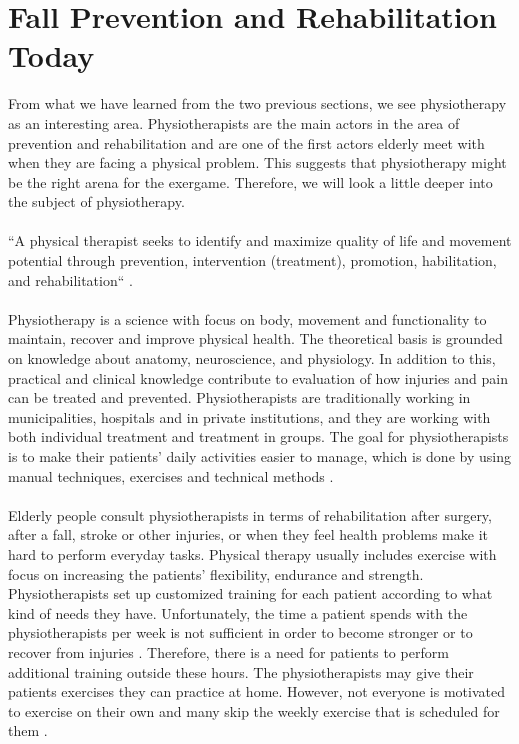 \section{Fall Prevention and Rehabilitation Today}
From what we have learned from the two previous sections, we see physiotherapy as an interesting area. Physiotherapists are the main actors in the area of prevention and rehabilitation and are one of the first actors elderly meet with when they are facing a physical problem. This suggests that physiotherapy might be the right arena for the exergame. Therefore, we will look a little deeper into the subject of physiotherapy. \\ \\“A physical therapist seeks to identify and maximize quality of life and movement potential through prevention, intervention (treatment), promotion, habilitation, and rehabilitation“ \cite{physiocite}.\\ \\
Physiotherapy is a science with focus on body, movement and functionality to maintain, recover and improve physical health. The theoretical basis is grounded on knowledge about anatomy, neuroscience, and physiology. In addition to this, practical and clinical knowledge contribute to evaluation of how injuries and pain can be treated and prevented. Physiotherapists are traditionally working in municipalities, hospitals and in private institutions, and they are working with both individual treatment and treatment in groups. The goal for physiotherapists is to make their patients' daily activities easier to manage, which is done by using manual techniques, exercises and technical methods \cite{physiotherapy1}\cite{physiotherapy2}.  \\ \\
Elderly people consult physiotherapists in terms of rehabilitation after surgery, after a fall, stroke or other injuries, or when they feel health problems make it hard to perform everyday tasks. Physical therapy usually includes exercise with focus on increasing the patients’ flexibility, endurance and strength. Physiotherapists set up customized training for each patient according to what kind of needs they have. Unfortunately, the time a patient spends with the physiotherapists per week is not sufficient in order to become stronger or to recover from injuries \cite{gruppetrening-trheim}. Therefore, there is a need for patients to perform additional training outside these hours. The physiotherapists may give their patients exercises they can practice at home. However, not everyone is motivated to exercise on their own and many skip the weekly exercise that is scheduled for them \cite{physiotherapy2}. 


